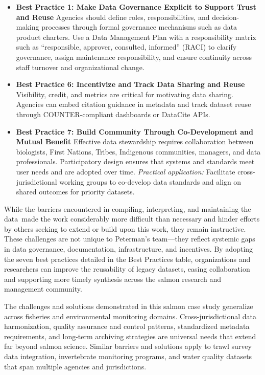 \documentclass[
  letterpaper,
  DIV=11,
  numbers=noendperiod]{scrartcl}
\begin{document}
\begin{itemize}
\item
  \textbf{Best Practice 1: Make Data Governance Explicit to Support
  Trust and Reuse} Agencies should define roles, responsibilities, and
  decision-making processes through formal governance mechanisms such as
  data product charters. Use a Data Management Plan with a
  responsibility matrix such as ``responsible, approver, consulted,
  informed'' (RACI) to clarify governance, assign maintenance
  responsibility, and ensure continuity across staff turnover and
  organizational change.
\item
  \textbf{Best Practice 6: Incentivize and Track Data Sharing and Reuse}
  Visibility, credit, and metrics are critical for motivating data
  sharing. Agencies can embed citation guidance in metadata and track
  dataset reuse through COUNTER-compliant dashboards or DataCite APIs.
\item
  \textbf{Best Practice 7: Build Community Through Co-Development and
  Mutual Benefit} Effective data stewardship requires collaboration
  between biologists, First Nations, Tribes, Indigenous communities,
  managers, and data professionals. Participatory design ensures that
  systems and standards meet user needs and are adopted over time.
  \emph{Practical application:} Facilitate cross-jurisdictional working
  groups to co-develop data standards and align on shared outcomes for
  priority datasets.
\end{itemize}

While the barriers encountered in compiling, interpreting, and
maintaining the data~made the work considerably more difficult than
necessary and hinder efforts by others seeking to extend or build upon
this work, they remain instructive. These challenges are not unique to
Peterman's team---they reflect systemic gaps in data governance,
documentation, infrastructure, and incentives. By adopting the seven
best practices detailed in the Best Practices table, organizations and
researchers can improve the reusability of legacy datasets, easing
collaboration and supporting more timely synthesis across the salmon
research and management community.

The challenges and solutions demonstrated in this salmon case study
generalize across fisheries and environmental monitoring domains.
Cross-jurisdictional data harmonization, quality assurance and control
patterns, standardized metadata requirements, and long-term archiving
strategies are universal needs that extend far beyond salmon science.
Similar barriers and solutions apply to trawl survey data integration,
invertebrate monitoring programs, and water quality datasets that span
multiple agencies and jurisdictions.
\end{document}
